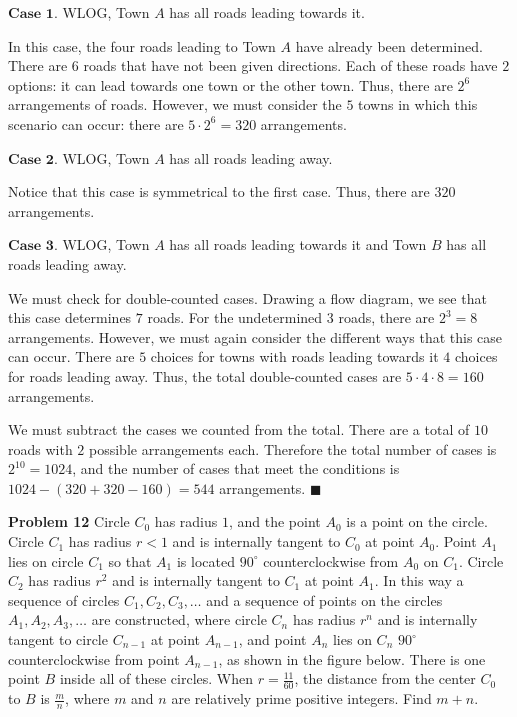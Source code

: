 \documentclass[a4paper,11pt]{article}
\begin{document}
$\textbf{Case 1}$. WLOG, Town $A$ has all roads leading towards it.

In this case, the four roads leading to Town $A$ have already been determined. There are $6$ roads that have not been given directions. Each of these roads have $2$ options: it can lead towards one town or the other town. Thus, there are $2^6$ arrangements of roads. However, we must consider the $5$ towns in which this scenario can occur: there are $5 \cdot 2^6=320$ arrangements.


$\textbf{Case 2}$. WLOG, Town $A$ has all roads leading away.

Notice that this case is symmetrical to the first case. Thus, there are $320$ arrangements.


$\textbf{Case 3}$. WLOG, Town $A$ has all roads leading towards it and Town $B$ has all roads leading away.

We must check for double-counted cases. Drawing a flow diagram, we see that this case determines $7$ roads. For the undetermined $3$ roads, there are $2^3=8$ arrangements. However, we must again consider the different ways that this case can occur. There are $5$ choices for towns with roads leading towards it $4$ choices for roads leading away. Thus, the total double-counted cases are $5 \cdot 4 \cdot 8=160$ arrangements.

We must subtract the cases we counted from the total. There are a total of $10$ roads with $2$ possible arrangements each. Therefore the total number of cases is $2^{10} =1024$, and the number of cases that meet the conditions is $1024 - (320+320-160) = \boxed{544}$ arrangements. \hfill $\blacksquare$

\textbf{Problem 12}
Circle $C_0$ has radius $1$, and the point $A_0$ is a point on the circle. Circle $C_1$ has radius $r<1$ and is internally tangent to $C_0$ at point $A_0$. Point $A_1$ lies on circle $C_1$ so that $A_1$ is located $90^{\circ}$ counterclockwise from $A_0$ on $C_1$. Circle $C_2$ has radius $r^2$ and is internally tangent to $C_1$ at point $A_1$. In this way a sequence of circles $C_1,C_2,C_3,\ldots$ and a sequence of points on the circles $A_1,A_2,A_3,\ldots$ are constructed, where circle $C_n$ has radius $r^n$ and is internally tangent to circle $C_{n-1}$ at point $A_{n-1}$, and point $A_n$ lies on $C_n$ $90^{\circ}$ counterclockwise from point $A_{n-1}$, as shown in the figure below. There is one point $B$ inside all of these circles. When $r = \frac{11}{60}$, the distance from the center $C_0$ to $B$ is $\frac{m}{n}$, where $m$ and $n$ are relatively prime positive integers. Find $m+n$.
\end{document}
